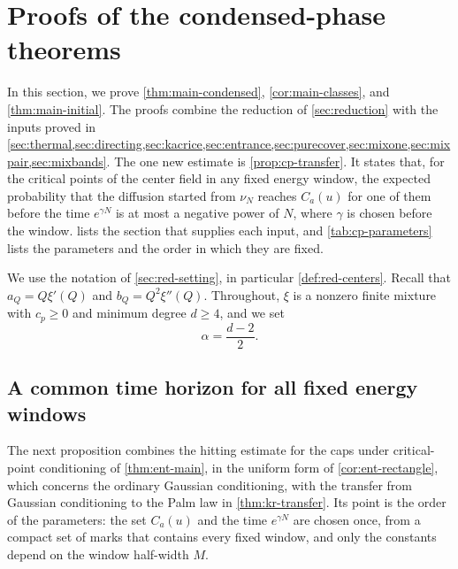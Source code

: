 \chapter{Proofs of the condensed-phase theorems}\label{sec:condproof}

In this section, we prove \cref{thm:main-condensed}, \cref{cor:main-classes}, and \cref{thm:main-initial}. The proofs combine the reduction of \cref{sec:reduction} with the inputs proved in \cref{sec:thermal,sec:directing,sec:kacrice,sec:entrance,sec:purecover,sec:mixone,sec:mixpair,sec:mixbands}. The one new estimate is \cref{prop:cp-transfer}. It states that, for the critical points of the center field in any fixed energy window, the expected probability that the diffusion started from $\nu_N$ reaches $C_a(u)$ for one of them before the time $e^{\gamma N}$ is at most a negative power of $N$, where $\gamma$ is chosen before the window.  lists the section that supplies each input, and \cref{tab:cp-parameters} lists the parameters and the order in which they are fixed.

We use the notation of \cref{sec:red-setting}, in particular \cref{def:red-centers}. Recall that $a_Q=Q\xi'(Q)$ and $b_Q=Q^2\xi''(Q)$. Throughout, $\xi$ is a nonzero finite mixture with $c_p\ge0$ and minimum degree $d\ge4$, and we set
\begin{equation*}
\alpha=\frac{d-2}{2}.
\end{equation*}

\section{A common time horizon for all fixed energy windows}\label{sec:cp-transfer}

The next proposition combines the hitting estimate for the caps under critical-point conditioning of \cref{thm:ent-main}, in the uniform form of \cref{cor:ent-rectangle}, which concerns the ordinary Gaussian conditioning, with the transfer from Gaussian conditioning to the Palm law in \cref{thm:kr-transfer}. Its point is the order of the parameters: the set $C_a(u)$ and the time $e^{\gamma N}$ are chosen once, from a compact set of marks that contains every fixed window, and only the constants depend on the window half-width $M$.

